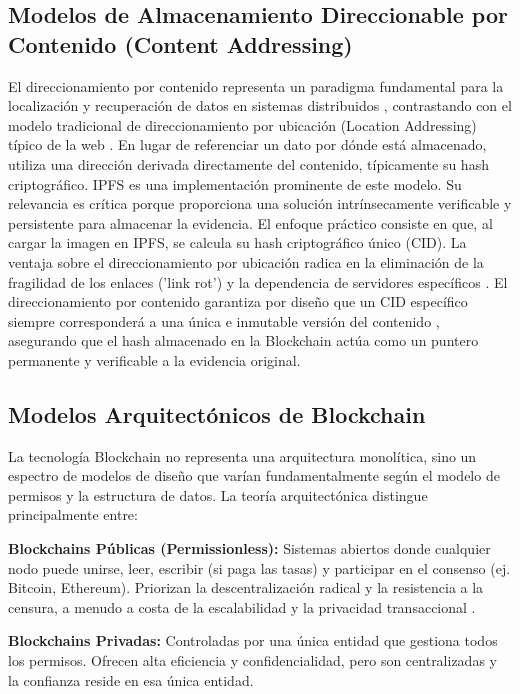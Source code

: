   
\subsection{Modelos de Almacenamiento Direccionable por Contenido (Content Addressing)} 

El direccionamiento por contenido representa un paradigma fundamental para la localización y recuperación de datos en sistemas distribuidos \parencite{voigt2017gdpr}, contrastando con el modelo tradicional de direccionamiento por ubicación (Location Addressing) típico de la web \parencite{fielding2000architectural}. En lugar de referenciar un dato por dónde está almacenado, utiliza una dirección derivada directamente del contenido, típicamente su hash criptográfico. IPFS \parencite{benet2014ipfs} es una implementación prominente de este modelo. Su relevancia es crítica porque proporciona una solución intrínsecamente verificable y persistente para almacenar la evidencia. El enfoque práctico consiste en que, al cargar la imagen en IPFS, se calcula su hash criptográfico único (CID). La ventaja sobre el direccionamiento por ubicación radica en la eliminación de la fragilidad de los enlaces ('link rot') y la dependencia de servidores específicos \parencite{voigt2017gdpr}. El direccionamiento por contenido garantiza por diseño que un CID específico siempre corresponderá a una única e inmutable versión del contenido \parencite{benet2014ipfs}, asegurando que el hash almacenado en la Blockchain actúa como un puntero permanente y verificable a la evidencia original. 

\subsection{ Modelos Arquitectónicos de Blockchain} 
La tecnología Blockchain no representa una arquitectura monolítica, sino un espectro de modelos de diseño que varían fundamentalmente según el modelo de permisos y la estructura de datos. La teoría arquitectónica distingue principalmente entre: 

\textbf{Blockchains Públicas (Permissionless):} Sistemas abiertos donde cualquier nodo puede unirse, leer, escribir (si paga las tasas) y participar en el consenso (ej. Bitcoin, Ethereum). Priorizan la descentralización radical y la resistencia a la censura, a menudo a costa de la escalabilidad y la privacidad transaccional \parencite{nakamoto2008bitcoin}. 

\textbf{Blockchains Privadas:} Controladas por una única entidad que gestiona todos los permisos. Ofrecen alta eficiencia y confidencialidad, pero son centralizadas y la confianza reside en esa única entidad. 

